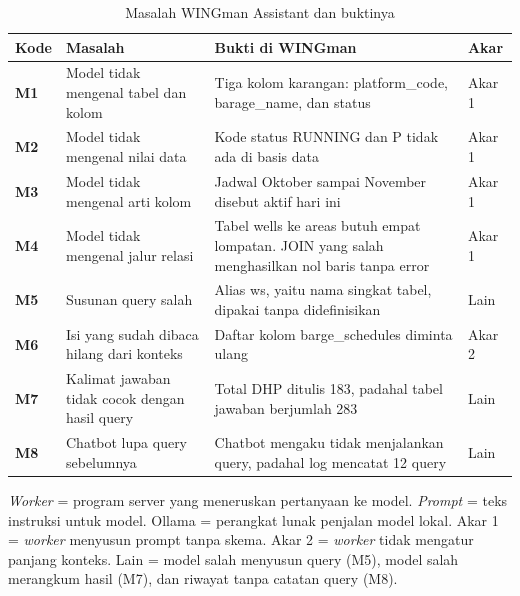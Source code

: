 \begin{table}[!htbp]
  \caption{Masalah WINGman Assistant dan buktinya}
  \label{tab:masalah}
  \footnotesize
  \begin{tabularx}{\textwidth}{|>{\raggedright\arraybackslash}p{0.8cm}|>{\raggedright\arraybackslash}p{3.4cm}|>{\raggedright\arraybackslash}X|>{\raggedright\arraybackslash}p{1.2cm}|}
    \hline
    \textbf{Kode} & \textbf{Masalah} & \textbf{Bukti di WINGman} & \textbf{Akar} \\
    \hline
    \textbf{M1} & Model tidak mengenal tabel dan kolom & Tiga kolom karangan: platform\_code, barage\_name, dan status & Akar 1 \\
    \hline
    \textbf{M2} & Model tidak mengenal nilai data & Kode status RUNNING dan P tidak ada di basis data & Akar 1 \\
    \hline
    \textbf{M3} & Model tidak mengenal arti kolom & Jadwal Oktober sampai November disebut aktif hari ini & Akar 1 \\
    \hline
    \textbf{M4} & Model tidak mengenal jalur relasi & Tabel wells ke areas butuh empat lompatan. JOIN yang salah menghasilkan nol baris tanpa error & Akar 1 \\
    \hline
    \textbf{M5} & Susunan query salah & Alias ws, yaitu nama singkat tabel, dipakai tanpa didefinisikan & Lain \\
    \hline
    \textbf{M6} & Isi yang sudah dibaca hilang dari konteks & Daftar kolom barge\_schedules diminta ulang & Akar 2 \\
    \hline
    \textbf{M7} & Kalimat jawaban tidak cocok dengan hasil query & Total DHP ditulis 183, padahal tabel jawaban berjumlah 283 & Lain \\
    \hline
    \textbf{M8} & Chatbot lupa query sebelumnya & Chatbot mengaku tidak menjalankan query, padahal log mencatat 12 query & Lain \\
    \hline
  \end{tabularx}
  \par\vspace{4pt}
  \parbox{\textwidth}{\footnotesize \emph{Worker} = program server yang meneruskan pertanyaan ke model. \emph{Prompt} = teks instruksi untuk model. Ollama = perangkat lunak penjalan model lokal. Akar 1 = \emph{worker} menyusun prompt tanpa skema. Akar 2 = \emph{worker} tidak mengatur panjang konteks. Lain = model salah menyusun query (M5), model salah merangkum hasil (M7), dan riwayat tanpa catatan query (M8).}
\end{table}


